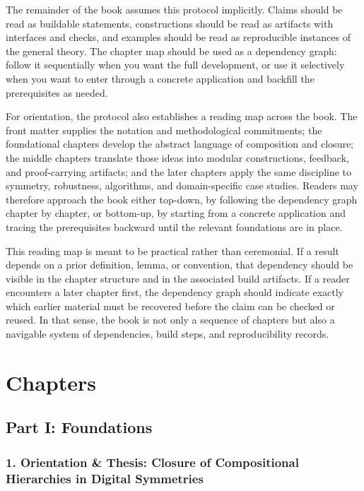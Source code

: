 \documentclass[11pt]{article}
\begin{document}
The remainder of the book assumes this protocol implicitly. Claims should be read as buildable statements, constructions should be read as artifacts with interfaces and checks, and examples should be read as reproducible instances of the general theory. The chapter map should be used as a dependency graph: follow it sequentially when you want the full development, or use it selectively when you want to enter through a concrete application and backfill the prerequisites as needed.

For orientation, the protocol also establishes a reading map across the book. The front matter supplies the notation and methodological commitments; the foundational chapters develop the abstract language of composition and closure; the middle chapters translate those ideas into modular constructions, feedback, and proof-carrying artifacts; and the later chapters apply the same discipline to symmetry, robustness, algorithms, and domain-specific case studies. Readers may therefore approach the book either top-down, by following the dependency graph chapter by chapter, or bottom-up, by starting from a concrete application and tracing the prerequisites backward until the relevant foundations are in place.

This reading map is meant to be practical rather than ceremonial. If a result depends on a prior definition, lemma, or convention, that dependency should be visible in the chapter structure and in the associated build artifacts. If a reader encounters a later chapter first, the dependency graph should indicate exactly which earlier material must be recovered before the claim can be checked or reused. In that sense, the book is not only a sequence of chapters but also a navigable system of dependencies, build steps, and reproducibility records.



\section{Chapters}

\subsection{Part I: Foundations}

\subsubsection{1. Orientation \& Thesis: Closure of Compositional Hierarchies in Digital Symmetries}
\end{document}
